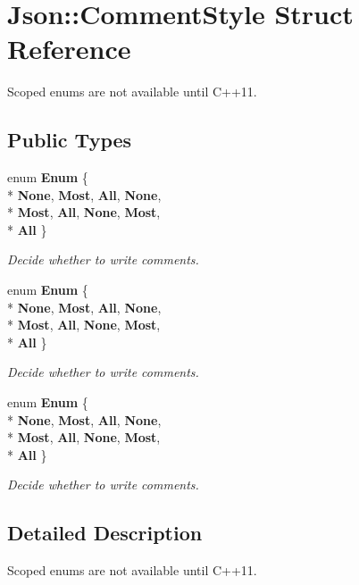 \section{Json\+:\+:Comment\+Style Struct Reference}
\label{struct_json_1_1_comment_style}


Scoped enums are not available until C++11.  


\subsection*{Public Types}
\begin{DoxyCompactItemize}
\item 
enum {\bf Enum} \{ \\*
{\bf None}, 
{\bf Most}, 
{\bf All}, 
{\bf None}, 
\\*
{\bf Most}, 
{\bf All}, 
{\bf None}, 
{\bf Most}, 
\\*
{\bf All}
 \}\begin{DoxyCompactList}\small\item\em Decide whether to write comments. \end{DoxyCompactList}
\item 
enum {\bf Enum} \{ \\*
{\bf None}, 
{\bf Most}, 
{\bf All}, 
{\bf None}, 
\\*
{\bf Most}, 
{\bf All}, 
{\bf None}, 
{\bf Most}, 
\\*
{\bf All}
 \}\begin{DoxyCompactList}\small\item\em Decide whether to write comments. \end{DoxyCompactList}
\item 
enum {\bf Enum} \{ \\*
{\bf None}, 
{\bf Most}, 
{\bf All}, 
{\bf None}, 
\\*
{\bf Most}, 
{\bf All}, 
{\bf None}, 
{\bf Most}, 
\\*
{\bf All}
 \}\begin{DoxyCompactList}\small\item\em Decide whether to write comments. \end{DoxyCompactList}
\end{DoxyCompactItemize}


\subsection{Detailed Description}
Scoped enums are not available until C++11. 

